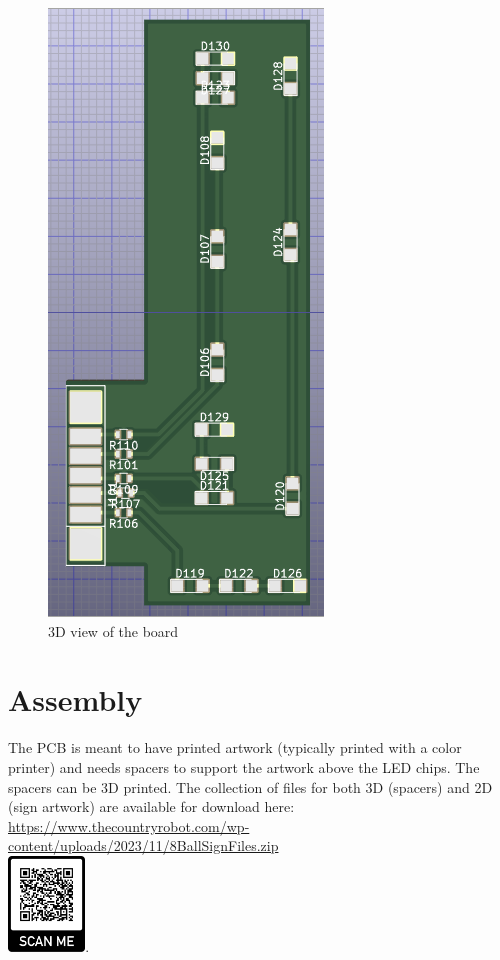 \documentclass[12pt,twoside]{article}
\begin{document}
\begin{figure}[hbpt]\begin{centering}%
\includegraphics{8BallLEDPCB.png}
\caption{3D view of the board}
\end{centering}\end{figure}


\section{Assembly}
The PCB is meant to have printed artwork (typically printed with a color 
printer) and needs spacers to support the artwork above the LED chips. The 
spacers can be 3D printed.  The collection of files for both 3D (spacers) and 
2D (sign artwork) are available for download here: 
\url{https://www.thecountryrobot.com/wp-content/uploads/2023/11/8BallSignFiles.zip} \\
\includegraphics[height=1in]{8ballsign_qr_download.png}.
\end{document}
